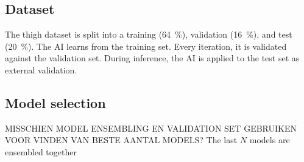 \subsection{Dataset}
The thigh dataset is split into a training (\qty{64}{\percent}), validation (\qty{16}{\percent}), and test (\qty{20}{\percent}).
The AI learns from the training set.
Every iteration, it is validated against the validation set.
During inference, the AI is applied to the test set as external validation.

\subsection{Model selection}
MISSCHIEN MODEL ENSEMBLING EN VALIDATION SET GEBRUIKEN VOOR VINDEN VAN BESTE AANTAL MODELS?
The last $N$ models are ensembled together
